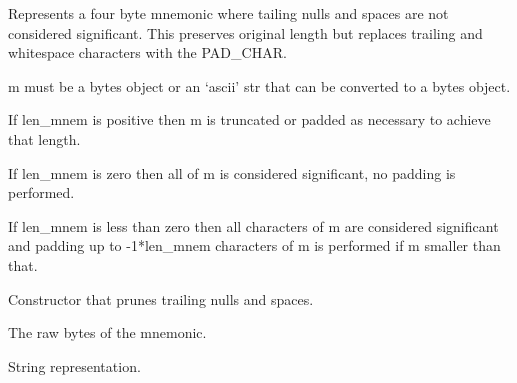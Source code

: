 \documentclass[letterpaper,10pt,english]{sphinxmanual}
\begin{document}
\begin{fulllineitems}
\label{\detokenize{ref/LIS/core/Mnem:TotalDepth.LIS.core.Mnem.Mnem}}
Represents a four byte mnemonic where tailing nulls and spaces are not
considered significant. This preserves original length but replaces trailing
and whitespace characters with the PAD\_CHAR.

m must be a bytes object or an ‘ascii’ str that can be converted to a bytes object.

If len\_mnem is positive then m is truncated or padded as necessary to
achieve that length.

If len\_mnem is zero then all of m is considered significant, no padding
is performed.

If len\_mnem is less than zero then all characters of m are considered
significant and padding up to -1*len\_mnem characters of m is 
performed if m smaller than that.

\begin{fulllineitems}
\label{\detokenize{ref/LIS/core/Mnem:TotalDepth.LIS.core.Mnem.Mnem.__init__}}
Constructor that prunes trailing nulls and spaces.

\end{fulllineitems}


\begin{fulllineitems}
\label{\detokenize{ref/LIS/core/Mnem:TotalDepth.LIS.core.Mnem.Mnem.m}}
The raw bytes of the mnemonic.

\end{fulllineitems}


\begin{fulllineitems}
\label{\detokenize{ref/LIS/core/Mnem:TotalDepth.LIS.core.Mnem.Mnem.__str__}}
String representation.

\end{fulllineitems}



\end{fulllineitems}
\end{document}
